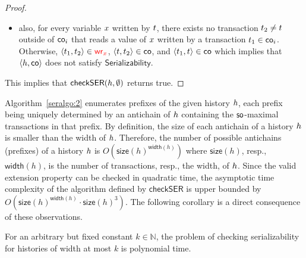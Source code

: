 \begin{proof}
\begin{itemize}
%
\item  also, for every variable $\xvar$ written by $\tr$, there exists no transaction $\tr_2 \neq \tr$ outside of $\co_i$ that reads a value of $\xvar$ written by a transaction $\tr_1 \in \co_i$. Otherwise, $\tup{\tr_1,\tr_2}\in\wro[\xvar]$, $\tup{\tr,\tr_2}\in \co$, and $\tup{\tr_1,\tr}\in\co$ which implies that $\tup{\hist,\co}$ does not satisfy $\mathsf{Serializability}$.
\end{itemize} 
This implies that $\mathsf{checkSER}(\hist,\emptyset)$ returns true.
\end{proof}

Algorithm~\ref{seralgo:2} enumerates prefixes of the given history $\hist$, each prefix being uniquely determined by an antichain of $\hist$ containing the $\so$-maximal transactions in that prefix. By definition, the size of each antichain of a history $\hist$ is smaller than the width of $\hist$. Therefore, the number of possible antichains (prefixes) of a history $\hist$ is $O(\mathsf{size}(h)^{\mathsf{width}(h)})$ where $\mathsf{size}(h)$, resp., $\mathsf{width}(h)$, is the number of transactions, resp., the width, of $\hist$. Since the valid extension property can be checked in quadratic time, the asymptotic time complexity of the algorithm defined by $\mathsf{checkSER}$ is upper bounded by $O(\mathsf{size}(h)^{\mathsf{width}(h)}\cdot \mathsf{size}(h)^3)$.
The following corollary is a direct consequence of these observations.

\begin{corollary}\label{cor:ser}

For an arbitrary but fixed constant $k\in\mathbb{N}$, the problem of checking serializability for histories of width at most $k$ is polynomial time.
\end{corollary}


